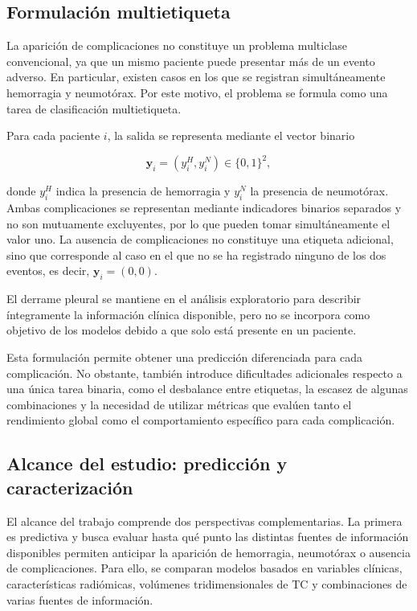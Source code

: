 \subsection{Formulación multietiqueta}

La aparición de complicaciones no constituye un problema multiclase convencional, ya que un mismo paciente puede presentar más de un evento adverso. En particular, existen casos en los que se registran simultáneamente hemorragia y neumotórax. Por este motivo, el problema se formula como una tarea de clasificación multietiqueta.

Para cada paciente \(i\), la salida se representa mediante el vector binario

\[
\mathbf{y}_i =
\left(
y_i^{H},
y_i^{N}
\right)
\in \{0,1\}^{2},
\]

donde \(y_i^{H}\) indica la presencia de hemorragia y \(y_i^{N}\) la presencia de neumotórax. Ambas complicaciones se representan mediante indicadores binarios separados y no son mutuamente excluyentes, por lo que pueden tomar simultáneamente el valor uno. La ausencia de complicaciones no constituye una etiqueta adicional, sino que corresponde al caso en el que no se ha registrado ninguno de los dos eventos, es decir, \(\mathbf{y}_i=(0,0)\).

El derrame pleural se mantiene en el análisis exploratorio para describir íntegramente la información clínica disponible, pero no se incorpora como objetivo de los modelos debido a que solo está presente en un paciente.

Esta formulación permite obtener una predicción diferenciada para cada complicación. No obstante, también introduce dificultades adicionales respecto a una única tarea binaria, como el desbalance entre etiquetas, la escasez de algunas combinaciones y la necesidad de utilizar métricas que evalúen tanto el rendimiento global como el comportamiento específico para cada complicación.

\subsection{Alcance del estudio: predicción y caracterización}

El alcance del trabajo comprende dos perspectivas complementarias. La primera es predictiva y busca evaluar hasta qué punto las distintas fuentes de información disponibles permiten anticipar la aparición de hemorragia, neumotórax o ausencia de complicaciones. Para ello, se comparan modelos basados en variables clínicas, características radiómicas, volúmenes tridimensionales de TC y combinaciones de varias fuentes de información.


